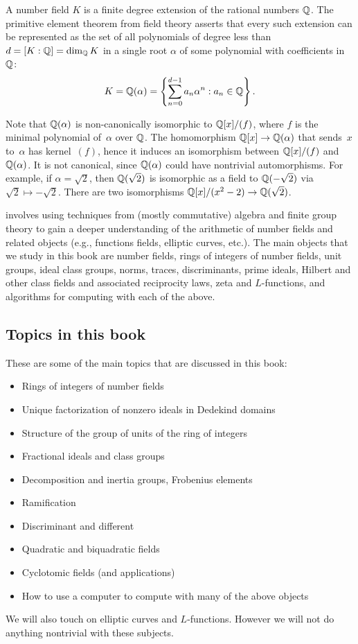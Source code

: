 A number field $K$ is a finite degree extension of the rational
numbers $\mathbb{Q}$.  The primitive element theorem from field theory
asserts that every such extension can be represented as the set of all
polynomials of degree less than $d = [K:\mathbb{Q}] = \dim_{\mathbb{Q}} K$ in
a single root $\alpha$ of some polynomial with coefficients in $\mathbb{Q}$:
$$
 K = \mathbb{Q}(\alpha) = \left\{ \sum_{n=0}^{d-1} a_n \alpha^n : a_n\in\mathbb{Q} \right\}.
$$

Note that
$\mathbb{Q}(\alpha)$ is non-canonically isomorphic to $\mathbb{Q}[x]/(f)$, where $f$
is the minimal polynomial of~$\alpha$ over $\mathbb{Q}$.
The homomorphism $\mathbb{Q}[x]\to\mathbb{Q}(\alpha)$ that sends~$x$ to~$\alpha$
has kernel~$(f)$, hence it induces an isomorphism between
$\mathbb{Q}[x]/(f)$ and $\mathbb{Q}(\alpha)$.
It is not canonical, since $\mathbb{Q}(\alpha)$ could
have nontrivial automorphisms.  For example, if $\alpha=\sqrt{2}$, then
$\mathbb{Q}(\sqrt{2})$ is isomorphic as a field to $\mathbb{Q}(-\sqrt{2})$ via
$\sqrt{2}\mapsto -\sqrt{2}$.  There are two isomorphisms
$\mathbb{Q}[x]/(x^2-2)\to \mathbb{Q}(\sqrt{2})$.

 involves using techniques from (mostly
commutative) algebra and finite group theory to gain a deeper
understanding of the arithmetic of number fields and related objects
(e.g., functions fields, elliptic curves, etc.).  The main objects that we
study in this book are number fields, rings of integers
of number fields, unit groups, ideal class groups, norms, traces,
discriminants, prime ideals, Hilbert and other class fields and
associated reciprocity laws, zeta and $L$-functions, and algorithms
for computing with each of the above.

\subsection{Topics in this book}
These are some of the main topics that are discussed in this book:
\begin{itemize}\setlength{\itemsep}{-.7ex}
	\item Rings of integers of number fields
	\item Unique factorization of nonzero ideals in Dedekind domains
	\item Structure of the group of units of the ring of integers
	\item Fractional ideals and class groups
	\item Decomposition and inertia groups, Frobenius elements
	\item Ramification
	\item Discriminant and different
	\item Quadratic and biquadratic fields
	\item Cyclotomic fields (and applications)
	\item How to use a computer to compute with many of the above objects
\end{itemize}
We will also touch on elliptic curves and $L$-functions.
However we will not do anything nontrivial with these subjects.



